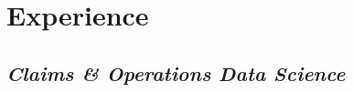\documentclass[letterpaper]{deedy-resume} %
\begin{document}
\begin{minipage}[t]{0.68\textwidth}


  \section{Experience}
  \hfill{}
  \sectionspace
  
  \subsection{\emph{Claims \& Operations Data Science}}
  

\end{minipage}
\end{document}
